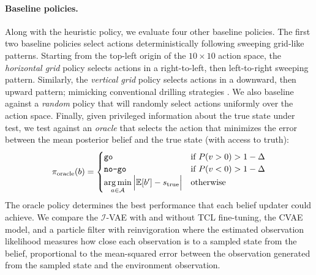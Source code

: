 \paragraph{Baseline policies.}
Along with the heuristic policy, we evaluate four other baseline policies.
The first two baseline policies select actions deterministically following sweeping grid-like patterns.
Starting from the top-left origin of the $10 \times 10$ action space, the \textit{horizontal grid} policy selects actions in a right-to-left, then left-to-right sweeping pattern.
Similarly, the \textit{vertical grid} policy selects actions in a downward, then upward pattern; mimicking conventional drilling strategies \cite{haldar2018mineral}.
We also baseline against a \textit{random} policy that will randomly select actions uniformly over the action space.
Finally, given privileged information about the true state under test, we test against an \textit{oracle} that selects the action that minimizes the error between the mean posterior belief and the true state (with access to truth):
\begin{equation}
    \pi_\text{oracle}(b) = \begin{cases}
        \texttt{go} & \text{if } P(v > 0) > 1 - \Delta \\
        \texttt{no-go} & \text{if } P(v < 0) > 1 - \Delta \\
        \argmin\limits_{a \in \mathcal{A}} \Big|\mathbb{E}[b'] - s_\text{true}\Big| & \text{otherwise}
    \end{cases}\label{eq:muon_oracle}
\end{equation}
The oracle policy determines the best performance that each belief updater could achieve.
We compare the $\mathcal{I}$-VAE with and without TCL fine-tuning, the CVAE model, and a particle filter with reinvigoration where the estimated observation likelihood measures how close each observation is to a sampled state from the belief, proportional to the mean-squared error between the observation generated from the sampled state and the environment observation.


